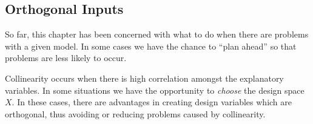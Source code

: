 \documentclass[
  a4paper,
]{article}
\theoremstyle{definition}
\theoremstyle{definition}
\theoremstyle{definition}
\theoremstyle{definition}
\theoremstyle{remark}
\begin{document}
\hypertarget{orthogonal-inputs}{%
\subsection{Orthogonal Inputs}\label{orthogonal-inputs}}

So far, this chapter has been concerned with what to do when there are problems
with a given model. In some cases we have the chance to ``plan ahead'' so that
problems are less likely to occur.

Collinearity occurs when there is high correlation amongst the explanatory
variables. In some situations we have the opportunity to \emph{choose} the design
space \(X\). In these cases, there are advantages in creating design variables
which are orthogonal, thus avoiding or reducing problems caused by
collinearity.
\end{document}
